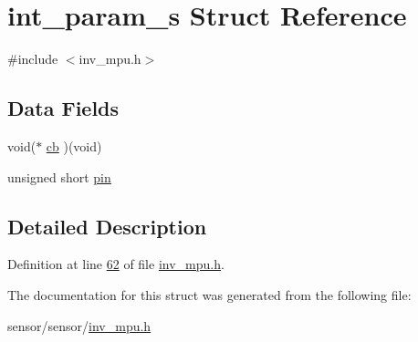\hypertarget{structint__param__s}{}\section{int\+\_\+param\+\_\+s Struct Reference}
\label{structint__param__s}


{\ttfamily \#include $<$inv\+\_\+mpu.\+h$>$}

\subsection*{Data Fields}
\begin{DoxyCompactItemize}
\item 
void($\ast$ \hyperlink{group___d_r_i_v_e_r_s_ga574999a803893e57b48324e39a5daa19}{cb} )(void)
\item 
unsigned short \hyperlink{group___d_r_i_v_e_r_s_ga503508a7ee88d8566cb3c882db1311b2}{pin}
\end{DoxyCompactItemize}


\subsection{Detailed Description}


Definition at line \hyperlink{inv__mpu_8h_source_l00062}{62} of file \hyperlink{inv__mpu_8h_source}{inv\+\_\+mpu.\+h}.



The documentation for this struct was generated from the following file\+:\begin{DoxyCompactItemize}
\item 
sensor/sensor/\hyperlink{inv__mpu_8h}{inv\+\_\+mpu.\+h}\end{DoxyCompactItemize}
